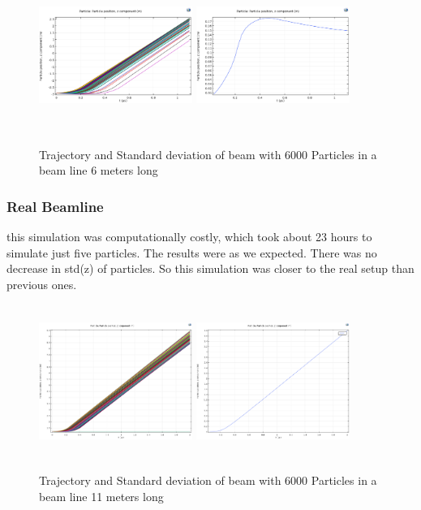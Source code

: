 \documentclass[12pt,a4paper]{article}
\begin{document}
\begin{figure}[h]
\centering
\includegraphics[width=50mm, height=50mm]{sim-in-100-long}
\includegraphics[width=50mm, height=50mm]{sim-std-100-long}
\caption{Trajectory and Standard deviation of beam with 6000 Particles in a beam line 6 meters long }
\end{figure}

\newpage
 
\subsubsection{Real Beamline}
this simulation was computationally costly, which took about 23 hours to simulate just five particles. The results were as we expected. There was no decrease in std(z) of particles. So this simulation was closer to the real setup than previous ones. 

\begin{figure}[h]
\centering
\includegraphics[width=50mm, height=50mm]{sim-in-100-11met}
\includegraphics[width=50mm, height=50mm]{sim-std-100-11met}
\caption{Trajectory and Standard deviation of beam with 6000 Particles in a beam line 11 meters long }
\end{figure}
\end{document}

